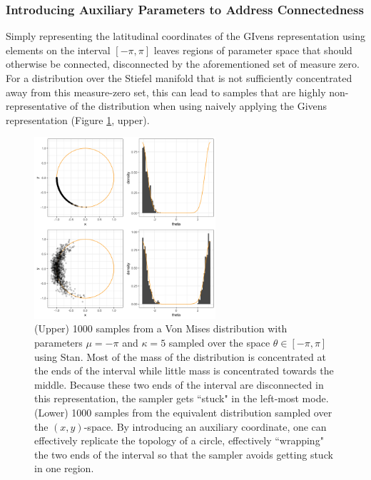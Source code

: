 \documentclass[ba]{imsart}
\numberwithin{equation}{section}
\theoremstyle{plain}
\begin{document}
\subsubsection{Introducing Auxiliary Parameters to Address Connectedness}
\noindent  Simply representing the latitudinal coordinates of the GIvens representation using elements on the interval $[-\pi,\pi]$ leaves regions of parameter space that should otherwise be connected, disconnected by the aforementioned set of measure zero. For a distribution over the Stiefel manifold that is not sufficiently concentrated away from this measure-zero set, this can lead to samples that are highly non-representative of the distribution when using naively applying the Givens representation (Figure \ref{fig:donut}, upper).

\begin{figure}[h]
\centering
\vspace{.1in}
\includegraphics[width=0.6\textwidth]{figures/donut.png}
\vspace{.05in}
\caption{(Upper) 1000 samples from a Von Mises distribution with parameters $\mu = -\pi$ and $\kappa = 5$ sampled over the space $\theta \in [-\pi, \pi]$ using Stan. Most of the mass of the distribution is concentrated at the ends of the interval while little mass is concentrated towards the middle. Because these two ends of the interval are disconnected in this representation, the sampler gets ``stuck" in the left-most mode. (Lower) 1000 samples from the equivalent distribution sampled over the $(x,y)$-space. By introducing an auxiliary coordinate, one can effectively replicate the topology of a circle, effectively ``wrapping" the two ends of the interval so that the sampler avoids getting stuck in one region.}
\label{fig:donut}
\end{figure}
\end{document}
